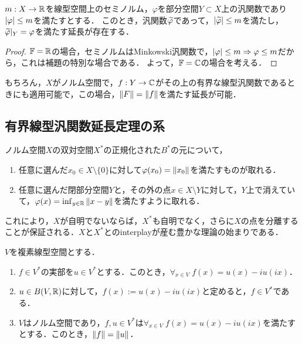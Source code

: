 \documentclass[uplatex,dvipdfmx]{jsreport}
\begin{document}
\begin{theorem}
    $m:X\to\mathbb{R}$を線型空間上のセミノルム，$\varphi$を部分空間$Y\subset X$上の汎関数であり$\lvert\varphi\rvert\le m$を満たすとする．
    このとき，汎関数$\widetilde{\varphi}$であって，$\lvert\widetilde{\varphi}\rvert\le m$を満たし，$\widetilde{\varphi}|_Y=\varphi$を満たす延長が存在する．
\end{theorem}
\begin{proof}
    $\mathbb{F}=\mathbb{R}$の場合，セミノルムはMinkowski汎関数で，$\lvert\varphi\rvert\le m\Rightarrow\varphi\le m$だから，これは補題の特別な場合である．
    よって，$\mathbb{F}=\mathbb{C}$の場合を考える．
\end{proof}
\begin{remarks}
    もちろん，$X$がノルム空間で，$f:Y\to\mathbb{C}$がその上の有界な線型汎関数であるときにも適用可能で，この場合，$\|F\|=\|f\|$を満たす延長が可能．
\end{remarks}

\subsection{有界線型汎関数延長定理の系}

\begin{tcolorbox}[colframe=ForestGreen, colback=ForestGreen!10!white,breakable,colbacktitle=ForestGreen!40!white,coltitle=black,fonttitle=\bfseries\sffamily,
title=]
    ノルム空間$X$の双対空間$X^*$の正規化された$B^*$の元について，
    \begin{enumerate}
        \item 任意に選んだ$x_0\in X\setminus\{0\}$に対して$\varphi(x_0)=\|x_0\|$を満たすものが取れる．
        \item 任意に選んだ閉部分空間$Y$と，その外の点$x\in X\setminus Y$に対して，$Y$上で消えていて，$\varphi(x)=\inf_{y\in\mathbb{R}}\|x-y\|$を満たすように取れる．
    \end{enumerate}
    これにより，$X$が自明でないならば，$X^*$も自明でなく，さらに$X$の点を分離することが保証される．$X$と$X^*$とのinterplayが産む豊かな理論の始まりである．
\end{tcolorbox}

\begin{proposition}[複素線型空間は実線形空間]
    $V$を複素線型空間とする．
    \begin{enumerate}
        \item $f\in V^*$の実部を$u\in V^*$とする．このとき，$\forall_{x\in V}\;f(x)=u(x)-iu(ix)$．
        \item $u\in B(V,\mathbb{R})$に対して，$f(x):=u(x)-iu(ix)$と定めると，$f\in V^*$である．
        \item $V$はノルム空間であり，$f,u\in V^*$は$\forall_{x\in V}\;f(x)=u(x)-iu(ix)$を満たすとする．このとき，$\|f\|=\|u\|$．
    \end{enumerate}
\end{proposition}
\end{document}
